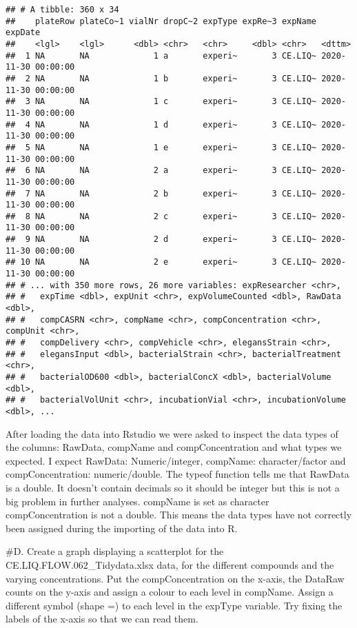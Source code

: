 \documentclass[
]{book}
\begin{document}
\begin{verbatim}
## # A tibble: 360 x 34
##    plateRow plateCo~1 vialNr dropC~2 expType expRe~3 expName expDate            
##    <lgl>    <lgl>      <dbl> <chr>   <chr>     <dbl> <chr>   <dttm>             
##  1 NA       NA             1 a       experi~       3 CE.LIQ~ 2020-11-30 00:00:00
##  2 NA       NA             1 b       experi~       3 CE.LIQ~ 2020-11-30 00:00:00
##  3 NA       NA             1 c       experi~       3 CE.LIQ~ 2020-11-30 00:00:00
##  4 NA       NA             1 d       experi~       3 CE.LIQ~ 2020-11-30 00:00:00
##  5 NA       NA             1 e       experi~       3 CE.LIQ~ 2020-11-30 00:00:00
##  6 NA       NA             2 a       experi~       3 CE.LIQ~ 2020-11-30 00:00:00
##  7 NA       NA             2 b       experi~       3 CE.LIQ~ 2020-11-30 00:00:00
##  8 NA       NA             2 c       experi~       3 CE.LIQ~ 2020-11-30 00:00:00
##  9 NA       NA             2 d       experi~       3 CE.LIQ~ 2020-11-30 00:00:00
## 10 NA       NA             2 e       experi~       3 CE.LIQ~ 2020-11-30 00:00:00
## # ... with 350 more rows, 26 more variables: expResearcher <chr>,
## #   expTime <dbl>, expUnit <chr>, expVolumeCounted <dbl>, RawData <dbl>,
## #   compCASRN <chr>, compName <chr>, compConcentration <chr>, compUnit <chr>,
## #   compDelivery <chr>, compVehicle <chr>, elegansStrain <chr>,
## #   elegansInput <dbl>, bacterialStrain <chr>, bacterialTreatment <chr>,
## #   bacterialOD600 <dbl>, bacterialConcX <dbl>, bacterialVolume <dbl>,
## #   bacterialVolUnit <chr>, incubationVial <chr>, incubationVolume <dbl>, ...
\end{verbatim}

After loading the data into Rstudio we were asked to inspect the data types of the columns: RawData, compName and compConcentration and what types we expected.
I expect RawData: Numeric/integer, compName: character/factor and compConcentration: numeric/double.
The typeof function tells me that RawData is a double. It doesn't contain decimals so it should be integer but this is not a big problem in further analyses. compName is set as character
compConcentration is not a double. This means the data types have not correctly been assigned during the importing of the data into R.

\#D. Create a graph displaying a scatterplot for the CE.LIQ.FLOW.062\_Tidydata.xlsx data, for the different compounds and the varying concentrations. Put the compConcentration on the x-axis, the DataRaw counts on the y-axis and assign a colour to each level in compName. Assign a different symbol (shape =) to each level in the expType variable. Try fixing the labels of the x-axis so that we can read them.
\end{document}
